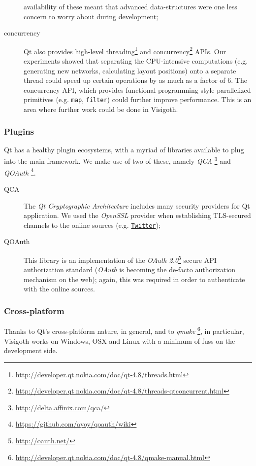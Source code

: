 \documentclass[a4paper,11pt,titlepage]{article}
\let\stdhref\href
\renewcommand{\href}[2]{\stdhref{#1}{\texttt{#2}}}
\newcommand{\code}[1]{\texttt{#1}}
\newcommand{\buzz}[1]{\emph{#1}}
\begin{document}
\begin{description}
  availability of these meant that advanced data-structures were one
  less concern to worry about during development;
\item [concurrency] Qt also provides high-level
  threading\footnote{\url{http://developer.qt.nokia.com/doc/qt-4.8/threads.html}}
  and
  concurrency\footnote{\url{http://developer.qt.nokia.com/doc/qt-4.8/threads-qtconcurrent.html}}
  APIs. Our experiments showed that separating the CPU-intensive
  computations (e.g. generating new networks, calculating layout
  positions) onto a separate thread could speed up certain operations
  by as much as a factor of $6$. The concurrency API, which provides
  functional programming style parallelized primitives
  (e.g. \code{map}, \code{filter}) could further improve performance.
  This is an area where further work could be done in Visigoth.
\end{description}

\subsubsection{Plugins}

Qt has a healthy plugin ecosystems, with a myriad of libraries
available to plug into the main framework. We make use of two of
these, namely
\buzz{QCA} \footnote{\url{http://delta.affinix.com/qca/}} and
\buzz{QOAuth} \footnote{\url{https://github.com/ayoy/qoauth/wiki}}.

\begin{description}
\item [QCA] The \buzz{Qt Cryptographic Architecture} includes many
  security providers for Qt application. We used the \buzz{OpenSSL}
  provider when establishing TLS-secured channels to the online
  sources (e.g. \href{http://twitter.com}{Twitter});
\item [QOAuth] This library is an implementation of the \buzz{OAuth
  2.0}\footnote{\url{http://oauth.net/}} secure API authorization
  standard (\buzz{OAuth} is becoming the de-facto authorization
  mechanism on the web); again, this was required in order to
  authenticate with the online sources.
\end{description}

\subsubsection{Cross-platform}

Thanks to Qt's cross-platform nature, in general, and to
\buzz{qmake} \footnote{\url{http://developer.qt.nokia.com/doc/qt-4.8/qmake-manual.html}},
in particular, Visigoth works on Windows, OSX and Linux with a minimum
of fuss on the development side.
\end{document}
